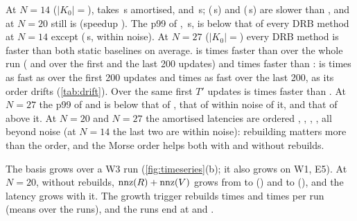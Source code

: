 At $N=14$ ($|K_0|={}$\NumWThreeNFourteenSize),  takes
\NumWThreeNFourteenMmhmAmort\,\textmu s amortised, 
\NumWThreeNFourteenFullSortedAmort{} and 
\NumWThreeNFourteenFullIdAmort\,\textmu s; 
(\NumWThreeNFourteenDrbIdAmort\,\textmu s) and 
(\NumWThreeNFourteenMmhmNorbAmort\,\textmu s) are slower than
, and at $N=20$  still is (speedup
\NumWThreeNTwentyDrbIdSpeedupFullSorted). The p99 of ,
\NumWThreeNFourteenFullSortedPNinetyNine\,\textmu s, is below that of every DRB
method at $N=14$ except  (\NumWThreeNFourteenMmhmPNinetyNine\,\textmu s,
within noise). At $N=27$ ($|K_0|={}$\NumWThreeNTwentySevenSize) every DRB method
is faster than both static baselines on average.  is
\NumWThreeNTwentySevenMmhmSpeedupFullSorted{} times faster than
 over the whole run
(\NumWThreeNTwentySevenMmhmSpeedupFullSortedFirstBlock{} and
\NumWThreeNTwentySevenMmhmSpeedupFullSortedLastBlock{} over the first and the
last 200 updates) and \NumWThreeNTwentySevenMmhmSpeedupFullId{} times faster
than :  is
\NumWThreeNTwentySevenFullIdSpeedupFullSortedFirstBlock{} times as fast as
 over the first 200 updates and
\NumWThreeNTwentySevenFullIdSpeedupFullSortedLastBlock{} times as fast over the
last 200, as its order drifts (\cref{tab:drift}). Over the same first $T'$ updates  is
\NumWThreeNTwentySevenMmhmSpeedupGudhi{} times faster than . At
$N=27$ the p99 of  and  is below that of
, that of  within noise of it, and that of
 above it. At $N=20$ and $N=27$ the amortised latencies are
ordered , , , ,
all beyond noise (at $N=14$ the last two are within noise): rebuilding matters
more than the order, and the Morse order helps both with and without rebuilds.

The basis grows over a W3 run (\cref{fig:timeseries}(b); it also grows on W1,
E5). At $N=20$, without rebuilds, $\operatorname{nnz}(R)+\operatorname{nnz}(V)$ grows from
\NumWThreeNTwentyDrbIdNnzStart{} to \NumWThreeNTwentyDrbIdNnzEnd{}
() and to \NumWThreeNTwentyMmhmNorbNnzEnd{} (),
and the latency grows with it. The growth trigger rebuilds 
\NumWThreeNTwentyMmhmRebuilds{} times and 
\NumWThreeNTwentyDrbIdRbRebuilds{} times per run (means over the runs), and the
runs end at \NumWThreeNTwentyMmhmNnzEnd{} and \NumWThreeNTwentyDrbIdRbNnzEnd.

